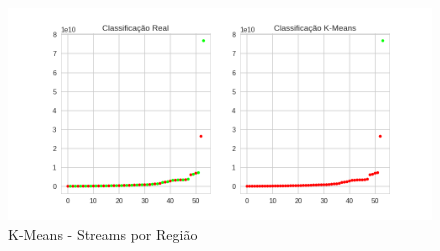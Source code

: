\documentclass[11pt]{article}
\makeatletter
\def\maxwidth{\ifdim\Gin@nat@width>\linewidth\linewidth
    \else\Gin@nat@width\fi}
\let\Oldincludegraphics\includegraphics
\renewcommand{\includegraphics}[1]{\Oldincludegraphics[width=.8\maxwidth]{#1}}
\makeatother
\begin{document}
\begin{figure}
\centering
\includegraphics{kmeans.png}
\caption{K-Means - Streams por Região}
\end{figure}


    
    
    
    
\end{document}
